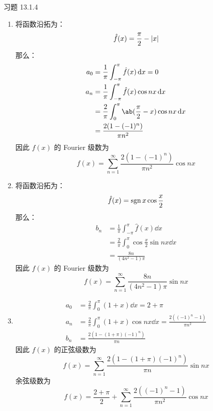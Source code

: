 \begin{problem}
    习题 13.1.4
    \begin{solution}
        \begin{enumerate}
            \item[\textbf{1)}] 将函数沿拓为：
            $$
            \hat{f}(x) = \frac{\pi}{2} - \abs{x}
            $$
            那么：
            $$
            \begin{aligned}
                a_0 & = \frac{1}{\pi} \int_{-\pi}^{\pi} \hat{f}(x) \dd{x} = 0 \\
                a_n & = \frac{1}{\pi} \int_{-\pi}^{\pi} \hat{f}(x) \cos n x \dd{x} \\
                & = \frac{2}{\pi} \int_{0}^{\pi} \ab(\frac{\pi}{2} - x) \cos n x \dd{x} \\
                & = \frac{2 (1 - (-1)^{n})}{\pi n^2}
            \end{aligned}
            $$
            因此 $f(x)$ 的 Fourier 级数为
            $$
            f(x) = \sum_{n = 1}^{\infty} \frac{2 (1 - (-1)^{n})}{\pi n^2} \cos n x
            $$

            \item[\textbf{2)}] 将函数沿拓为：
            $$
            \hat{f}(x) = \operatorname{sgn} x \cos \frac{x}{2}
            $$
            那么：
            $$
            \begin{aligned}
                b_n & = \frac{1}{\pi} \int_{-\pi}^{\pi} \hat{f}(x) \dd{x} \\
                & = \frac{2}{\pi} \int_{0}^{\pi} \cos \frac{x}{2} \sin n x \dd{x} \\
                & = \frac{8 n}{(4n^2 - 1)\pi}
            \end{aligned}
            $$
            因此 $f(x)$ 的 Fourier 级数为
            $$
            f(x) = \sum_{n = 1}^{\infty} \frac{8 n}{(4n^2 - 1)\pi} \sin n x
            $$

            \item[\textbf{4)}]
            $$
            \begin{aligned}
                a_0 & = \frac{2}{\pi} \int_{0}^{\pi} (1 + x) \dd{x} = 2 + \pi \\
                a_n & = \frac{2}{\pi} \int_{0}^{\pi} (1 + x) \cos n x \dd{x} = \frac{2 ((-1)^{n} - 1)}{\pi n^2} \\
                b_n & = \frac{2 (1 - (1 + \pi)(-1)^{n})}{\pi n}
            \end{aligned}
            $$
            因此 $f(x)$ 的正弦级数为
            $$
            f(x) = \sum_{n = 1}^{\infty} \frac{2(1 - (1 + \pi)(-1)^{n})}{\pi n} \sin n x
            $$
            余弦级数为
            $$
            f(x) = \frac{2 + \pi}{2} + \sum_{n = 1}^{\infty} \frac{2((-1)^{n} - 1)}{\pi n^2} \cos n x
            $$
        \end{enumerate}
    \end{solution}
\end{problem}

